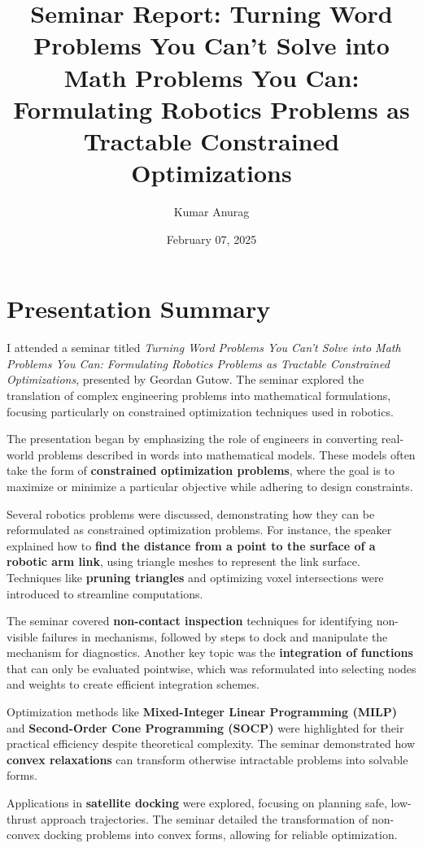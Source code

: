 \documentclass{article}
\title{Seminar Report: Turning Word Problems You Can’t Solve into Math Problems You Can: Formulating Robotics Problems as Tractable Constrained Optimizations}
\author{Kumar Anurag}
\date{February 07, 2025}
\begin{document}
\maketitle

\section{Presentation Summary}
I attended a seminar titled \textit{Turning Word Problems You Can’t Solve into Math Problems You Can: Formulating Robotics Problems as Tractable Constrained Optimizations}, presented by Geordan Gutow. The seminar explored the translation of complex engineering problems into mathematical formulations, focusing particularly on constrained optimization techniques used in robotics.

The presentation began by emphasizing the role of engineers in converting real-world problems described in words into mathematical models. These models often take the form of \textbf{constrained optimization problems}, where the goal is to maximize or minimize a particular objective while adhering to design constraints.

Several robotics problems were discussed, demonstrating how they can be reformulated as constrained optimization problems. For instance, the speaker explained how to \textbf{find the distance from a point to the surface of a robotic arm link}, using triangle meshes to represent the link surface. Techniques like \textbf{pruning triangles} and optimizing voxel intersections were introduced to streamline computations.

The seminar covered \textbf{non-contact inspection} techniques for identifying non-visible failures in mechanisms, followed by steps to dock and manipulate the mechanism for diagnostics. Another key topic was the \textbf{integration of functions} that can only be evaluated pointwise, which was reformulated into selecting nodes and weights to create efficient integration schemes. 

Optimization methods like \textbf{Mixed-Integer Linear Programming (MILP)} and \textbf{Second-Order Cone Programming (SOCP)} were highlighted for their practical efficiency despite theoretical complexity. The seminar demonstrated how \textbf{convex relaxations} can transform otherwise intractable problems into solvable forms.

Applications in \textbf{satellite docking} were explored, focusing on planning safe, low-thrust approach trajectories. The seminar detailed the transformation of non-convex docking problems into convex forms, allowing for reliable optimization.
\end{document}

